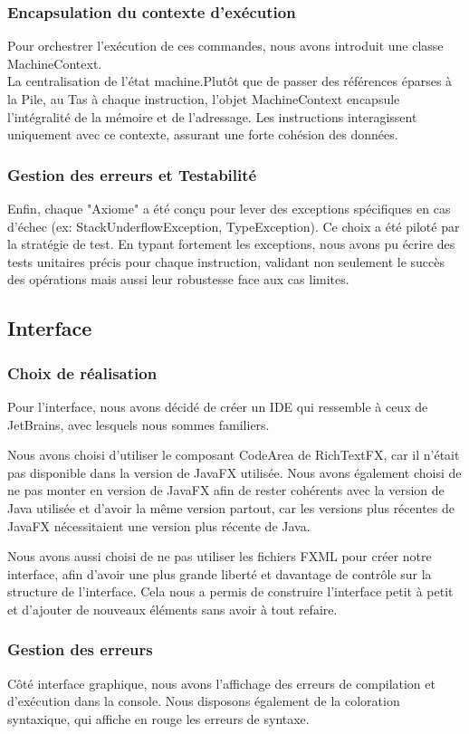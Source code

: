 \subsubsection{Encapsulation du contexte d'exécution}

Pour orchestrer l'exécution de ces commandes, nous avons introduit une classe MachineContext.\\

La centralisation de l'état machine.Plutôt que de passer des références éparses à la Pile, au Tas à chaque instruction, l'objet MachineContext encapsule l'intégralité de la mémoire et de l'adressage. Les instructions interagissent uniquement avec ce contexte, assurant une forte cohésion des données.

\subsubsection{Gestion des erreurs et Testabilité}

Enfin, chaque "Axiome" a été conçu pour lever des exceptions spécifiques en cas d'échec (ex: StackUnderflowException, TypeException). Ce choix a été piloté par la stratégie de test. En typant fortement les exceptions, nous avons pu écrire des tests unitaires précis pour chaque instruction, validant non seulement le succès des opérations mais aussi leur robustesse face aux cas limites.

\subsection{Interface}
\subsubsection{Choix de réalisation}
Pour l’interface, nous avons décidé de créer un IDE qui ressemble à ceux de JetBrains, avec lesquels nous sommes familiers.

Nous avons choisi d’utiliser le composant CodeArea de RichTextFX, car il n’était pas disponible dans la version de JavaFX utilisée. Nous avons également choisi de ne pas monter en version de JavaFX afin de rester cohérents avec la version de Java utilisée et d’avoir la même version partout, car les versions plus récentes de JavaFX nécessitaient une version plus récente de Java.

Nous avons aussi choisi de ne pas utiliser les fichiers FXML pour créer notre interface, afin d’avoir une plus grande liberté et davantage de contrôle sur la structure de l’interface. Cela nous a permis de construire l’interface petit à petit et d’ajouter de nouveaux éléments sans avoir à tout refaire.

\subsubsection{Gestion des erreurs}
Côté interface graphique, nous avons l’affichage des erreurs de compilation et d’exécution dans la console. Nous disposons également de la coloration syntaxique, qui affiche en rouge les erreurs de syntaxe.